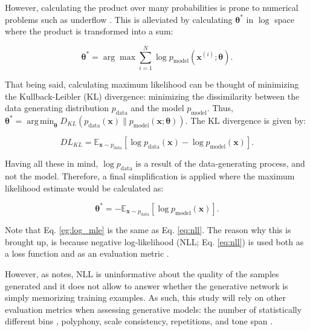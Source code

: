 \documentclass[a4paper]{book}
\DeclareMathOperator*{\argmin}{arg\,min}
\begin{document}
However, calculating the product over many probabilities is prone to numerical problems such as underflow \parencite{goodfellow_nips_2016}. This is alleviated by calculating $\bm{\theta^*}$ in $\log$ space where the product is transformed into a sum:

\begin{equation}
    \bm{\theta^*} = \arg \max \sum_{i=1}^N \log p_{\text{model}}(\bm{x}^{(i)}; \bm{\theta}) \label{eg:log_mle}.
\end{equation}

That being said, calculating maximum likelihood can be thought of minimizing the Kullback-Leibler (KL) divergence: minimizing the dissimilarity between the data generating distribution $p_{\text{data}}$ and the model $p_{\text{model}}$. Thus, $\bm{\theta^*} = \argmin_{\bm{\theta}} D_{KL}(p_{\text{data}}(\bm{x}) \| p_{\text{model}} (\bm{x}; \bm{\theta}))$. The KL divergence is given by:

\begin{equation}
    DL_{KL} = \mathbb{E}_{\mathbf{x} \sim p_{\text{data}}} [\log p_{\text{data}} (\bm{x}) - \log p_{\text{model}} (\bm{x})] \label{eq:kl_div}.
\end{equation}

Having all these in mind, $\log p_{\text{data}}$ is a result of the data-generating process, and not the model. Therefore, a final simplification is applied where the maximum likelihood estimate would be calculated as:

\begin{equation}
    \bm{\theta^*} = - \mathbb{E}_{\mathbf{x} \sim p_{\text{data}}} [\log p_{\text{model}} (\bm{x})] \label{eq:nll}.
\end{equation}

Note that Eq. \ref{eg:log_mle} is the same as Eq. \ref{eq:nll}. The reason why this is brought up, is because negative log-likelihood (NLL; Eq. \ref{eq:nll}) is used both as a loss function and as an evaluation metric \parencite[also for generative models;][]{yu_seqgan_2016, borji_pros_2018}.

However, as \textcite{borji_pros_2018} notes, NLL is uninformative about the quality of the samples generated and it does not allow to answer whether the generative network is simply memorizing training examples. As such, this study will rely on other evaluation metrics when assessing generative models: the number of statistically different bins \parencite[NDB;][]{richardson_gans_2018}, polyphony, scale consistency, repetitions, and tone span \parencite{mogren_c-rnn-gan_2016}.
\end{document}

